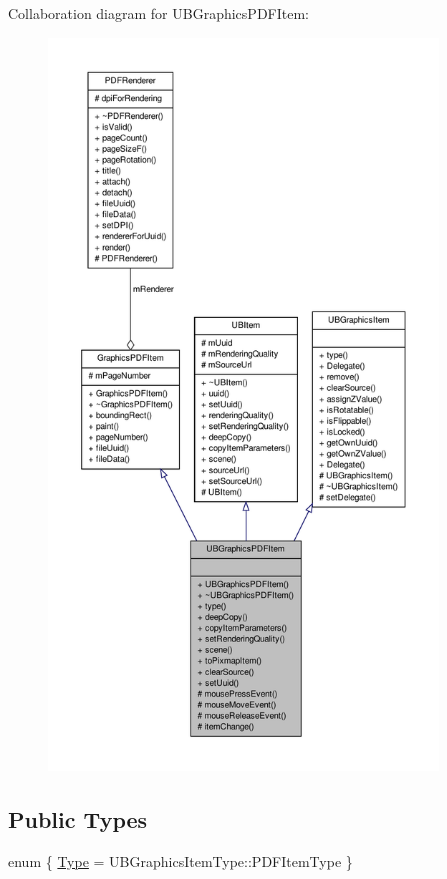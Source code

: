Collaboration diagram for U\-B\-Graphics\-P\-D\-F\-Item\-:
\nopagebreak
\begin{figure}[H]
\begin{center}
\leavevmode
\includegraphics[height=550pt]{d4/d4f/class_u_b_graphics_p_d_f_item__coll__graph}
\end{center}
\end{figure}
\subsection*{Public Types}
\begin{DoxyCompactItemize}
\item 
enum \{ \hyperlink{class_u_b_graphics_p_d_f_item_a56e43a0129d572d8c4b5455234ea27d4a9b0affff6e387354ac8fc3d678c6c10d}{Type} =  U\-B\-Graphics\-Item\-Type\-:\-:P\-D\-F\-Item\-Type
 \}
\end{DoxyCompactItemize}
